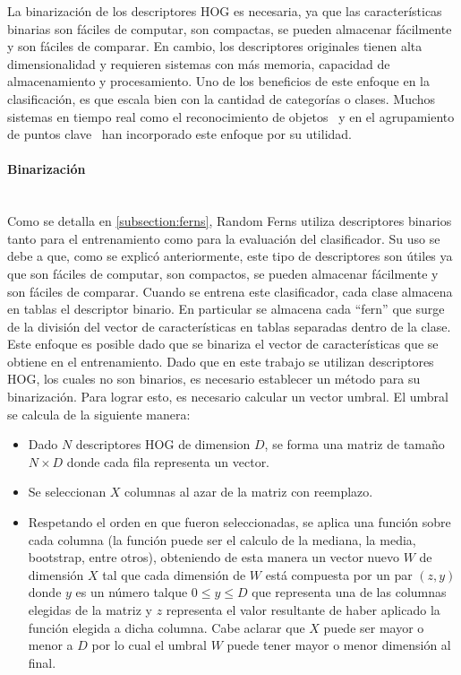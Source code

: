 	La binarización de los descriptores HOG es necesaria, ya que las características binarias son fáciles de computar, son compactas, se pueden almacenar fácilmente y son fáciles de comparar. En cambio, los descriptores originales tienen alta dimensionalidad y requieren sistemas con más memoria, capacidad de almacenamiento y procesamiento. Uno de los beneficios de este enfoque en la clasificación, es que escala bien con la cantidad de categorías o clases. Muchos sistemas en tiempo real como el reconocimiento de objetos~\cite{SJC08} y en el agrupamiento de puntos clave~\cite{OFL07} han incorporado este enfoque por su utilidad.

	
	\paragraph{Binarización} ~\\
	
		Como se detalla en \ref{subsection:ferns}, Random Ferns utiliza descriptores binarios tanto para el entrenamiento como para la evaluación del clasificador. Su uso se debe a que, como se explicó anteriormente, este tipo de descriptores son útiles ya que son fáciles de computar, son compactos, se pueden almacenar fácilmente y son fáciles de comparar. Cuando se entrena este clasificador, cada clase almacena en tablas el descriptor binario. En particular se almacena cada ``fern'' que surge de la división del vector de características en tablas separadas dentro de la clase. Este enfoque es posible dado que se binariza el vector de características que se obtiene en el entrenamiento. Dado que en este trabajo se utilizan descriptores HOG, los cuales no son binarios, es necesario establecer un método para su binarización. Para lograr esto, es necesario calcular un vector umbral. El umbral se calcula de la siguiente manera:
		\begin{itemize}
			\item Dado $N$ descriptores HOG de dimension $D$, se forma una matriz de tamaño $N \times D$ donde cada fila representa un vector.
			\item Se seleccionan $X$ columnas al azar de la matriz con reemplazo.
			\item Respetando el orden en que fueron seleccionadas, se aplica una función sobre cada columna (la función puede ser el calculo de la mediana, la media, bootstrap, entre otros), obteniendo de esta manera un vector nuevo $W$ de dimensión $X$ tal que cada dimensión de $W$ está compuesta por un par $(z,y)$ donde $y$ es un número talque $0 \leq y \leq D$ que representa una de las columnas elegidas de la matriz y $z$ representa el valor resultante de haber aplicado la función elegida a dicha columna. Cabe aclarar que $X$ puede ser mayor o menor a $D$ por lo cual el umbral $W$ puede tener mayor o menor dimensión al final.
		\end{itemize}
		

